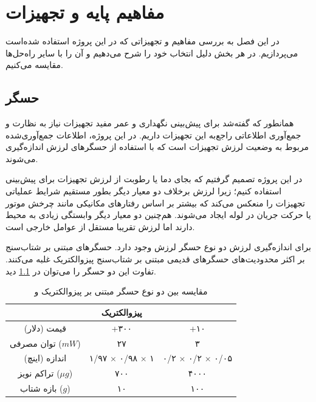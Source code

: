\chapter{مفاهیم پایه و تجهیزات‌}

در این فصل به بررسی مفاهیم و تجهیزاتی که در این پروژه استفاده شده‌است می‌پردازیم. در هر بخش دلیل انتخاب خود را شرح می‌دهیم و آن را با سایر راه‌حل‌ها مقایسه می‌کنیم.

\section{حسگر}
همانطور که گفته‌شد برای پیش‌بینی نگهداری و عمر مفید تجهیزات نیاز به نظارت و جمع‌آوری اطلاعاتی راجع‌به این تجهیزات داریم. در این پروژه، اطلاعات جمع‌آوری‌شده مربوط به وضعیت لرزش تجهیزات است که با استفاده از حسگرهای لرزش  اندازه‌گیری می‌شوند.


در این پروژه تصمیم گرفتیم که بجای دما یا رطوبت از لرزش تجهیزات برای پیش‌بینی استفاده کنیم؛ زیرا لرزش برخلاف دو معیار دیگر بطور مستقیم شرایط عملیاتی تجهیزات را منعکس می‌کند که بیشتر بر اساس رفتارهای مکانیکی مانند چرخش موتور یا حرکت جریان در لوله ایجاد می‌شوند. هم‌چنین دو معیار دیگر وابستگی زیادی به محیط دارند اما لرزش تقریبا مستقل از عوامل خارجی است\cite{jung2017vibration}.


برای اندازه‌گیری لرزش دو نوع حسگر لرزش وجود دارد. حسگرهای مبتنی بر شتاب‌سنج  بر اکثر محدودیت‌های حسگرهای قدیمی مبتنی بر شتاب‌سنج پیزوالکتریک غلبه می‌کنند. تفاوت این دو حسگر را می‌توان در \cref{sensor_comparison} \cite{jung2017vibration} دید.

\begin{table}[h!]
  \begin{center}
    \caption{مقایسه بین دو نوع حسگر مبتنی بر پیزوالکتریک و  \cite{jung2017vibration}}
    \label{sensor_comparison}
    \begin{tabular}{|c|c|c|} %
    \hline
    	& پیزوالکتریک & \lr{MEMS}\\
    	\hline
    	قیمت (دلار) & +۳۰۰ & +۱۰\\
    	\hline
    	توان مصرفی ($mW$) & ۲۷ & ۳\\
    	\hline
    	اندازه (اینچ) & ۱/۹۷ × ۰/۹۸ × ۱ & ۰/۲ × ۰/۲ × ۰/۰۵\\
    	\hline
    	تراکم نویز ($\mu g$) & ۷۰۰ & ۴۰۰۰\\
    	\hline
    	بازه شتاب ($g$) & ۱۰ & ۱۰۰\\
    	\hline
    \end{tabular}
  \end{center}
\end{table}

